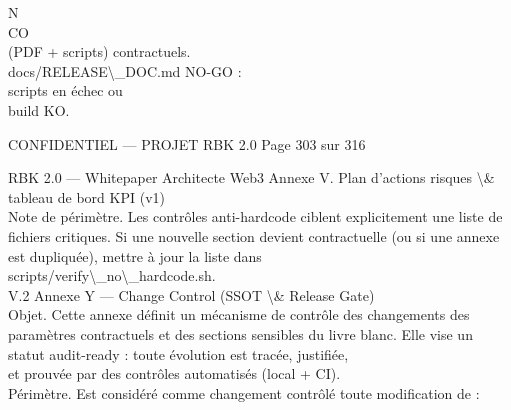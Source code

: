 \vspace{0.5em}
\vspace{0.5em}
\vspace{0.5em}
\vspace{0.5em}
N\\
CO\\
(PDF + scripts)     contractuels.\\
docs/RELEASE\textbackslash{}_DOC.md NO-GO :\\
scripts en échec ou\\
build KO.\\
\vspace{0.5em}
\vspace{0.5em}
\vspace{0.5em}
\vspace{0.5em}
\begin{confidential}CONFIDENTIEL — PROJET RBK 2.0                                  Page 303 sur 316\end{confidential}
RBK 2.0 — Whitepaper Architecte Web3                                                                                         Annexe V. Plan d’actions risques \textbackslash{}& tableau de bord KPI (v1)\\
\vspace{0.5em}
\vspace{0.5em}
Note de périmètre. Les contrôles anti-hardcode ciblent explicitement une liste de fichiers critiques. Si une nouvelle section devient contractuelle (ou si une annexe est dupliquée), mettre à jour la liste dans\\
\vspace{0.5em}
scripts/verify\textbackslash{}_no\textbackslash{}_hardcode.sh.\\
\vspace{0.5em}
\vspace{0.5em}
\vspace{0.5em}
\vspace{0.5em}
V.2 Annexe Y — Change Control (SSOT \textbackslash{}& Release Gate)\\
Objet. Cette annexe définit un mécanisme de contrôle des changements des paramètres contractuels et des sections sensibles du livre blanc. Elle vise un statut audit-ready : toute évolution est tracée, justifiée,\\
\vspace{0.5em}
et prouvée par des contrôles automatisés (local + CI).\\
\vspace{0.5em}
Périmètre. Est considéré comme changement contrôlé toute modification de :\\
